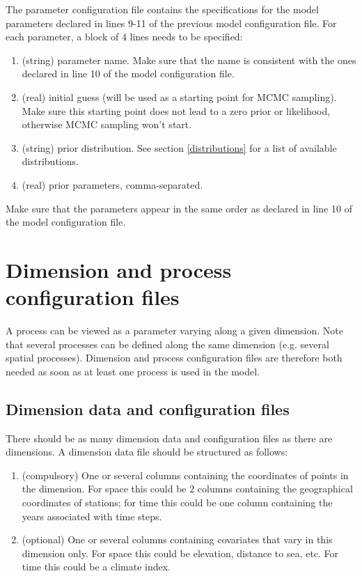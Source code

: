 \documentclass[a4paper]{article}
\begin{document}
	The parameter configuration file contains the specifications for the model parameters declared in lines 9-11 of the previous model configuration file. For each parameter, a block of 4 lines needs to be specified:
	
	\begin{enumerate}
		\item (string) parameter name. Make sure that the name is consistent with the ones declared in line 10 of the model configuration file.
		\item (real) initial guess (will be used as a starting point for MCMC sampling). Make sure this starting point does not lead to a zero prior or likelihood, otherwise MCMC sampling won't start.
		\item (string) prior distribution. See section \ref{distributions} for a list of available distributions.
		\item (real) prior parameters, comma-separated.		
	\end{enumerate}
	 
	 Make sure that the parameters appear in the same order as declared in line 10 of the model configuration file.
			
	\section{Dimension and process configuration files}
	
	A process can be viewed as a parameter varying along a given dimension. Note that several processes can be defined along the same dimension (e.g. several spatial processes). Dimension and process configuration files are therefore both needed as soon as at least one process is used in the model.
	
	\subsection{Dimension data and configuration files}
	
	There should be as many dimension data and configuration files as there are dimensions. A dimension data file should be structured as follows: 
	
	\begin{enumerate}
		\item (compulsory) One or several columns containing the coordinates of points in the dimension. For space this could be 2 columns containing the geographical coordinates of stations; for time this could be one column containing the years associated with time steps. 
		\item (optional) One or several columns containing covariates that vary in this dimension only. For space this could be elevation, distance to sea, etc. For time this could be a climate index.
	\end{enumerate}
\end{document}

